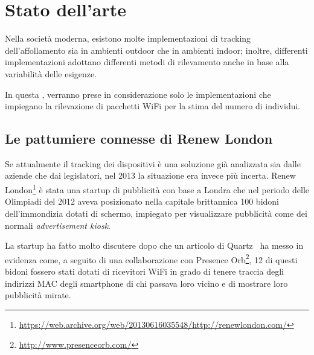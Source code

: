 \section{Stato dell'arte}\label{sec:state-of-art}




Nella società moderna, esistono molte implementazioni di tracking dell'affollamento sia in ambienti outdoor che in ambienti indoor;
inoltre, differenti implementazioni adottano differenti metodi di rilevamento anche in base alla variabilità delle esigenze.

In questa , verranno prese in considerazione solo le implementazioni che impiegano la rilevazione di pacchetti WiFi per la stima del numero di individui.

\subsection[Renew London \& Presence Orb]{Le pattumiere connesse di Renew London}

Se attualmente il tracking dei dispositivi è una soluzione già analizzata sia dalle aziende che dai legislatori, nel 2013 la situazione era invece più incerta.
Renew London\footnote{\url{https://web.archive.org/web/20130616035548/http://renewlondon.com/}} è stata una startup di pubblicità con base a Londra
che nel periodo delle Olimpiadi del 2012 aveva posizionato nella capitale brittannica 100 bidoni dell'immondizia dotati di schermo, impiegato per visualizzare pubblicità come dei normali \textit{advertisement kiosk}.

La startup ha fatto molto discutere dopo che un articolo di Quartz~\cite{Datoo2013} ha messo in evidenza come, a seguito di una collaborazione con Presence Orb\footnote{\url{http://www.presenceorb.com/}},
12 di questi bidoni fossero stati dotati di ricevitori WiFi in grado di tenere traccia degli indirizzi MAC degli smartphone di chi passava loro vicino e di mostrare loro pubblicità mirate.

